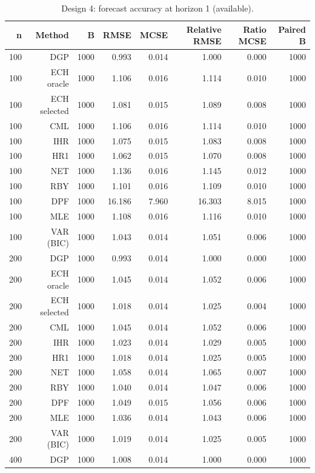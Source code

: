 \begin{table}[p]\centering
\caption{Design 4: forecast accuracy at horizon 1 (available).}
\small
\begin{tabular}{rrrrrrrr}\toprule
n & Method & B & RMSE & MCSE & Relative RMSE & Ratio MCSE & Paired B \\\midrule
100 & DGP & 1000 & 0.993 & 0.014 & 1.000 & 0.000 & 1000 \\
100 & ECH oracle & 1000 & 1.106 & 0.016 & 1.114 & 0.010 & 1000 \\
100 & ECH selected & 1000 & 1.081 & 0.015 & 1.089 & 0.008 & 1000 \\
100 & CML & 1000 & 1.106 & 0.016 & 1.114 & 0.010 & 1000 \\
100 & IHR & 1000 & 1.075 & 0.015 & 1.083 & 0.008 & 1000 \\
100 & HR1 & 1000 & 1.062 & 0.015 & 1.070 & 0.008 & 1000 \\
100 & NET & 1000 & 1.136 & 0.016 & 1.145 & 0.012 & 1000 \\
100 & RBY & 1000 & 1.101 & 0.016 & 1.109 & 0.010 & 1000 \\
100 & DPF & 1000 & 16.186 & 7.960 & 16.303 & 8.015 & 1000 \\
100 & MLE & 1000 & 1.108 & 0.016 & 1.116 & 0.010 & 1000 \\
100 & VAR (BIC) & 1000 & 1.043 & 0.014 & 1.051 & 0.006 & 1000 \\
200 & DGP & 1000 & 0.993 & 0.014 & 1.000 & 0.000 & 1000 \\
200 & ECH oracle & 1000 & 1.045 & 0.014 & 1.052 & 0.006 & 1000 \\
200 & ECH selected & 1000 & 1.018 & 0.014 & 1.025 & 0.004 & 1000 \\
200 & CML & 1000 & 1.045 & 0.014 & 1.052 & 0.006 & 1000 \\
200 & IHR & 1000 & 1.023 & 0.014 & 1.029 & 0.005 & 1000 \\
200 & HR1 & 1000 & 1.018 & 0.014 & 1.025 & 0.005 & 1000 \\
200 & NET & 1000 & 1.058 & 0.014 & 1.065 & 0.007 & 1000 \\
200 & RBY & 1000 & 1.040 & 0.014 & 1.047 & 0.006 & 1000 \\
200 & DPF & 1000 & 1.049 & 0.015 & 1.056 & 0.006 & 1000 \\
200 & MLE & 1000 & 1.036 & 0.014 & 1.043 & 0.006 & 1000 \\
200 & VAR (BIC) & 1000 & 1.019 & 0.014 & 1.025 & 0.005 & 1000 \\
400 & DGP & 1000 & 1.008 & 0.014 & 1.000 & 0.000 & 1000 \\

\end{tabular}
\end{table}
